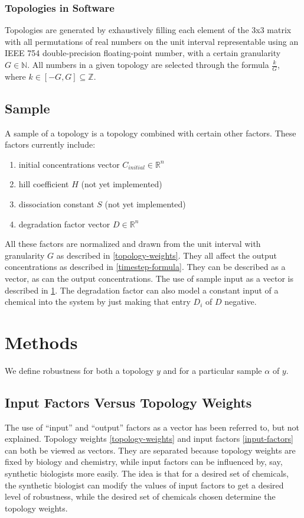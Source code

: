 \documentclass{article}
\begin{document}
\subsubsection{Topologies in Software}
Topologies are generated by exhaustively filling each element of the 3x3 matrix with all permutations of real numbers on the unit interval representable using an IEEE 754 double-precision floating-point number, with a certain granularity $G \in \mathbb{N}$. All numbers in a given topology are selected through the formula $\frac{k}{G}$, where $k \in [-G,G] \subseteq \mathbb{Z}$.

\subsection{Sample}
A sample of a topology is a topology combined with certain other factors. These factors currently include:

\begin{enumerate} \label{input-factors}
\item initial concentrations vector $C_{initial} \in \mathbb{R}^n$
\item hill coefficient $H$ (not yet implemented) \cite{igem-hill-coefficients}
\item dissociation constant $S$ (not yet implemented) \cite{igem-hill-coefficients}
\item degradation factor vector $D \in \mathbb{R}^n$
\end{enumerate}

All these factors are normalized and drawn from the unit interval with granularity $G$ as described in \ref{topology-weights}. They all affect the output concentrations as described in \eqref{timestep-formula}. They can be described as a vector, as can the output concentrations. The use of sample input as a vector is described in \ref{statistic-analysis}. The degradation factor can also model a constant input of a chemical into the system by just making that entry $D_i$ of $D$ negative.

\section{Methods} \label{statistic-analysis}
We define robustness for both a topology $y$ and for a particular sample $\alpha$ of $y$.

\subsection{Input Factors Versus Topology Weights}
The use of ``input'' and ``output'' factors as a vector has been referred to, but not explained. Topology weights \ref{topology-weights} and input factors \ref{input-factors} can both be viewed as vectors. They are separated because topology weights are fixed by biology and chemistry, while input factors can be influenced by, say, synthetic biologists more easily. The idea is that for a desired set of chemicals, the synthetic biologist can modify the values of input factors to get a desired level of robustness, while the desired set of chemicals chosen determine the topology weights.
\end{document}
